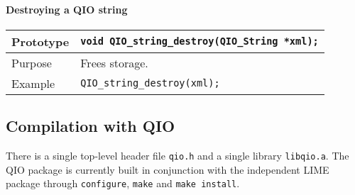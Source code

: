 \documentclass{article}
\newcommand{\QIOstring}{{\tt QIO\_String }}
\begin{document}
\paragraph{Destroying a QIO string}

\begin{flushleft}
  \begin{tabular}{|l|l|}
  \hline
  Prototype      & \verb|void QIO_string_destroy(|\QIOstring \verb|*xml);|\\
    \hline
  Purpose        & Frees storage. \\
   \hline
  Example        & \verb|QIO_string_destroy(xml);| \\
   \hline
 \end{tabular}
\end{flushleft}
%

\subsection{Compilation with QIO}

There is a single top-level header file \verb|qio.h| and a single
library \verb|libqio.a|.  The QIO package is currently built in
conjunction with the independent LIME package through
\verb|configure|, \verb|make| and \verb|make install|.
\end{document}
